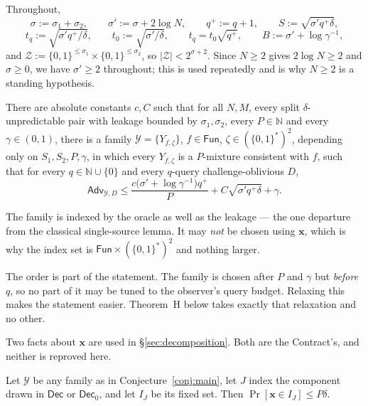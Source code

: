 \documentclass{aicr-solution}
\newcommand{\Fun}{\mathsf{Fun}}
\newcommand{\Adv}{\mathsf{Adv}}
\newcommand{\Dec}{\mathsf{Dec}}
\newcommand{\Prob}[1]{\Pr\!\left[#1\right]}
\newcommand{\bits}{\{0,1\}}
\newcommand{\vx}{\mathbf{x}}
\begin{document}
Throughout,
\[
  \sigma := \sigma_1 + \sigma_2, \qquad
  \sigma' := \sigma + 2\log N, \qquad
  q^{+} := q + 1, \qquad
  S := \sqrt{\sigma' q^{+} \delta},
\]
\[
  t_q := \sqrt{\sigma' q^{+}/\delta}, \qquad
  t_0 := \sqrt{\sigma'/\delta}, \qquad
  t_q = t_0\sqrt{q^{+}}, \qquad
  B := \sigma' + \log \gamma^{-1},
\]
and $\mathcal{Z} := \bits^{\le \sigma_1} \times \bits^{\le \sigma_2}$, so
$|\mathcal{Z}| < 2^{\sigma+2}$. Since $N \ge 2$ gives $2 \log N \ge 2$ and
$\sigma \ge 0$, we have $\sigma' \ge 2$ throughout; this is used repeatedly and
is why $N \ge 2$ is a standing hypothesis.

\begin{conjecture}\label{conj:main}
There are absolute constants $c, C$ such that for all $N, M$, every split
$\delta$-unpredictable pair with leakage bounded by $\sigma_1,\sigma_2$, every
$P \in \mathbb{N}$ and every $\gamma \in (0,1)$, there is a family
$\mathcal{Y} = \{Y_{f,\zeta}\}$, $f \in \Fun$, $\zeta \in (\bits^{*})^{2}$,
depending only on $S_1, S_2, P, \gamma$, in which every $Y_{f,\zeta}$ is a
$P$-mixture consistent with $f$, such that for every $q \in \mathbb{N} \cup \{0\}$
and every $q$-query challenge-oblivious $D$,
\[
  \Adv_{\mathcal{Y},D} \le
  \frac{c\bigl(\sigma' + \log \gamma^{-1}\bigr) q^{+}}{P}
  + C\sqrt{\sigma' q^{+} \delta} + \gamma .
\]
\end{conjecture}

\begin{remark}\label{rem:index}
The family is indexed by the oracle as well as the leakage --- the one departure
from the classical single-source lemma. It may \emph{not} be chosen using $\vx$,
which is why the index set is $\Fun \times (\bits^{*})^{2}$ and nothing larger.
\end{remark}

\begin{remark}\label{rem:order}
The order is part of the statement. The family is chosen after $P$ and $\gamma$ but
\emph{before} $q$, so no part of it may be tuned to the observer's query budget.
Relaxing this makes the statement easier. Theorem~H below takes exactly that
relaxation and no other.
\end{remark}

Two facts about $\vx$ are used in \S\ref{sec:decomposition}. Both are the
Contract's, and neither is reproved here.

\begin{lemma}\label{lem:hit}
Let $\mathcal{Y}$ be any family as in Conjecture~\ref{conj:main}, let $J$ index the
component drawn in $\Dec$ or $\Dec_0$, and let $I_J$ be its fixed set. Then
$\Prob{\vx \in I_J} \le P\delta$.
\end{lemma}
\end{document}
